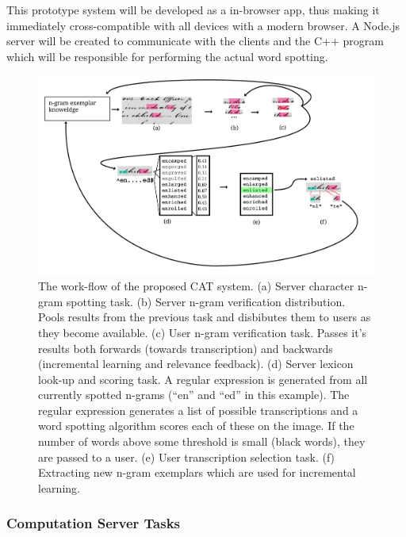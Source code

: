 \documentclass[ms]{byuprop}
\begin{document}
This prototype system will be developed as a in-browser app, thus making it immediately cross-compatible with all devices with a modern browser. A Node.js server will be created to communicate with the clients and the C++ program which will be responsible for performing the actual word spotting.

\begin{figure}
    \centering
    \includegraphics[width=.95\textwidth]{flow6}
    \caption{The work-flow of the proposed CAT system. (a) Server character n-gram spotting task. (b) Server n-gram verification distribution. Pools results from the previous task and disbibutes them to users as they become available. (c) User n-gram verification task. Passes it's results both forwards (towards transcription) and backwards (incremental learning and relevance feedback). (d) Server lexicon look-up and scoring task. A regular expression is generated from all currently spotted n-grams (``en'' and ``ed'' in this example). The regular expression generates a list of possible transcriptions and a word spotting algorithm scores each of these on the image. If the number of words above some threshold is small (black words), they are passed to a user. (e) User transcription selection task. (f) Extracting new n-gram exemplars which are used for incremental learning.}
    \label{fig:system_diagram}
\end{figure}


\subsubsection{Computation Server Tasks}
\end{document}
